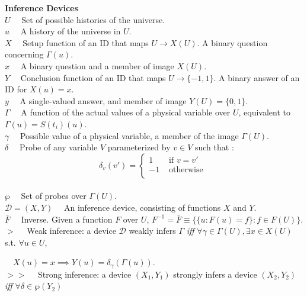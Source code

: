 \documentclass[11pt]{article}
\begin{document}
\textbf{Inference Devices} \\
$ U \quad $ Set of possible histories of the universe. \\
$ u \quad $ A history of the universe in $ U $. \\ 
$ X \quad $ Setup function of an ID that maps $ U \rightarrow X(U) $. A binary question concerning $ \Gamma(u) $. \\
$ x \quad $ A binary question and a member of image $ X(U) $. \\ 
$ Y \quad $ Conclusion function of an ID that maps $ U \rightarrow \{-1, 1\} $. A binary answer of an ID for  $ X(u) = x $. \\ 
$ y \quad $ A single-valued answer, and member of image $ Y(U)  = \{0, 1\} $. \\ 
$ \Gamma \quad $ A function of the actual values of a physical variable over $U$, equivalent to $\Gamma(u) = S(t_i)(u)$.  \\
$ \gamma \quad $ Possible value of a physical variable, a member of the image $\Gamma(U)$. \\
$ \delta \quad $ Probe of any variable $V$ parameterized by $v \in V$ such that : 
	  \[ \delta_v (v') =
	  \begin{cases} 
       1 & \text{ if } v = v' \\
       -1 & \text{ otherwise } \\
      \end{cases}\] \\
$ \wp \quad $ Set of probes over $\Gamma(U)$. \\
$ \mathcal{D} = (X, Y) \quad $ An inference device, consisting of functions $ X $ and $ Y $. \\
$ \bar{F} \quad $ Inverse. Given a function $ F $ over $ U $, $F ^ {-1} = \bar{F} \equiv \{\{u : F(u) = f \} : f \in F(U) \} $. \\
$ > \quad $ Weak inference: a device $\mathcal{D}$ weakly infers $\Gamma$ \textit{iff} $ \forall \gamma \in \Gamma(U), \exists x \in X(U) $ s.t. $ \forall u \in U $, 

$ \quad X(u) = x \implies Y(u) = \delta_{\gamma}(\Gamma(u)) $.  \\
$ >> \quad $ Strong inference: a device $ (X_1, Y_1) $ strongly infers a device $ (X_2, Y_2) $ \textit{ iff } $\forall \delta \in \wp(Y_2) $ 
\end{document}
